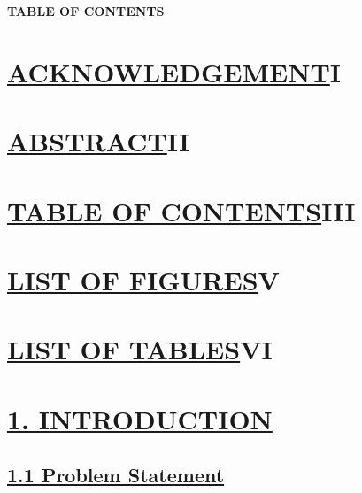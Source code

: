 \documentclass[a4paper,12pt]{article}
\begin{document}
  
				
		\newpage
				
		\begin{flushleft}
			\fontsize{14}{16}\selectfont\textbf{TABLE OF CONTENTS}
   \label{TOC}
		\end{flushleft}

            \section*{\fontsize{12}{14}\selectfont \hyperref[pageI]{ACKNOWLEDGEMENT}\protect\dotfill I}
				
		\section*{\fontsize{12}{14}\selectfont \hyperref[pageII]{ABSTRACT}\protect\dotfill II}

   \section*{\fontsize{12}{14}\selectfont \hyperref[TOC]{TABLE OF CONTENTS}\protect\dotfill III}

  \section*{\fontsize{12}{14}\selectfont \hyperref[LOF]{LIST OF FIGURES}\protect\dotfill V}

  \section*{\fontsize{12}{14}\selectfont \hyperref[list]{LIST OF TABLES}\protect\dotfill VI}



  	\section*{\fontsize{12}{14}\selectfont \hyperref[page1]{1. 
          INTRODUCTION }\protect{}}
				
		\subsection*{\fontsize{12}{14}\selectfont \hyperref[problem] {1.1 Problem Statement} \protect{}}
								
\end{document}
